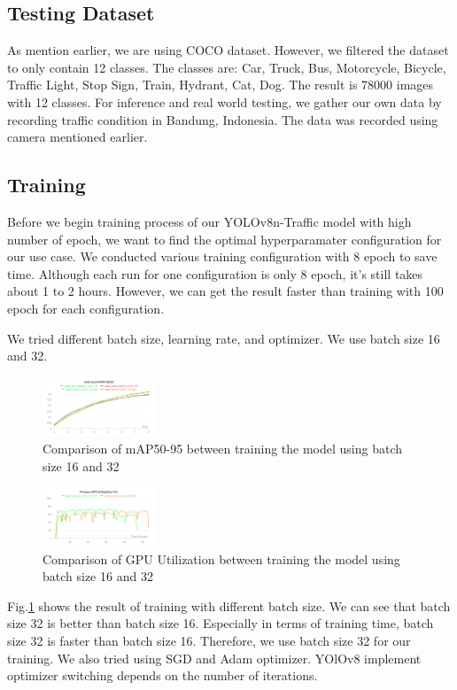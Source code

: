 \documentclass[conference]{IEEEtran}
\begin{document}
\subsection{Testing Dataset}
As mention earlier, we are using COCO dataset. However, we filtered the dataset to only contain 12 classes. The classes are:
Car, Truck, Bus, Motorcycle, Bicycle, Traffic Light, Stop Sign, Train, Hydrant, Cat, Dog. The result is 78000 images with 12 classes.
For inference and real world testing, we gather our own data by recording traffic condition in Bandung, Indonesia. The data was recorded using camera mentioned earlier.

\subsection{Training}
Before we begin training process of our YOLOv8n-Traffic model with high number of epoch, we want to find the optimal hyperparamater configuration for our use case. We conducted various training configuration with 8 epoch to save time.
Although each run for one configuration is only 8 epoch, it's still takes about 1 to 2 hours. However, we can get the result faster than training with 100 epoch for each configuration.

We tried different batch size, learning rate, and optimizer. We use batch size 16 and 32.
\begin{figure}[h]
\centering
\includegraphics[width=0.3\textwidth,keepaspectratio]{mAP_batch_size_comparison.png} %
\caption{Comparison of mAP50-95 between training the model using batch size 16 and 32}
\label{fig:batch_size}
\end{figure}

\begin{figure}[h!]
\centering
\includegraphics[width=0.3\textwidth,keepaspectratio]{gpu_utilization_comparison.png} 
\caption{Comparison of GPU Utilization between training the model using batch size 16 and 32}
\label{fig:gpu_utilization}
\end{figure}
Fig.\ref{fig:batch_size} shows the result of training with different batch size. We can see that batch size 32 is better than batch size 16. Especially in terms of training time, batch size 32 is faster than batch size 16.
Therefore, we use batch size 32 for our training. We also tried using SGD and Adam optimizer. YOlOv8 implement optimizer switching depends on the number of iterations.
\end{document}
